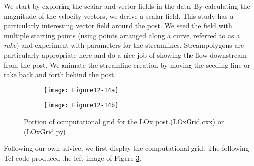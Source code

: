 We start by exploring the scalar and vector fields in the data. By calculating the magnitude of the velocity vectors, we derive a scalar field. This study has a particularly interesting vector field around the post. We seed the field with multiple starting points (using points arranged along a curve, referred to as a \emph{rake}) and experiment with parameters for the streamlines. Streampolygons are particularly appropriate here and do a nice job of showing the flow downstream from the post. We animate the streamline creation by moving the seeding line or rake back and forth behind the post.

\begin{figure}[htb]
	\begin{subfigure}[h]{0.48\linewidth}
		\texttt{[image: Figure12-14a]}
		\caption*{}
		\label{fig:Figure12-14a}
	\end{subfigure}
	\hfill
	\begin{subfigure}[h]{0.48\linewidth}
		\texttt{[image: Figure12-14b]}
		\caption*{}
		\label{fig:Figure12-14b}
	\end{subfigure}
	\caption{Portion of computational grid for the LOx post.(\href{https://lorensen.github.io/VTKExamples/site/Cxx/VisualizationAlgorithms/LOxGrid/}{LOxGrid.cxx}) or (\href{https://lorensen.github.io/VTKExamples/site/Python/VisualizationAlgorithms/LOxGrid/}{LOxGrid.py})}\label{fig:Figure12-14}
\end{figure}

Following our own advice, we first display the computational grid. The
following Tcl code produced the left image of Figure \ref{fig:Figure12-14}.

